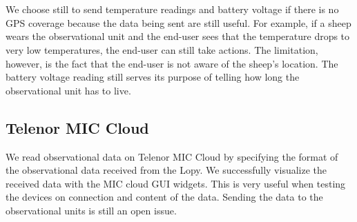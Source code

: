 		\\\\
		We choose still to send temperature readings and battery voltage if there is no GPS coverage because the data being sent are still useful. For example, if a sheep wears the observational unit and the end-user sees that the temperature drops to very low temperatures, the end-user can still take actions. The limitation, however, is the fact that the end-user is not aware of the sheep’s location. The battery voltage reading still serves its purpose of telling how long the observational unit has to live.
		
	\subsection{Telenor MIC Cloud}
		We read observational data on Telenor MIC Cloud by specifying the format of the observational data received from the Lopy. We successfully visualize the received data with the MIC cloud GUI widgets. This is very useful when testing the devices on connection and content of the data. Sending the data to the observational units is still an open issue.
	 
		
